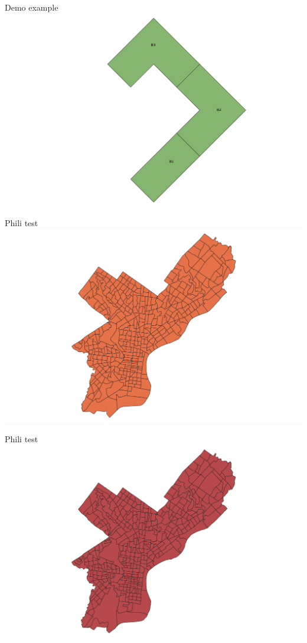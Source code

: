 \documentclass{beamer}
\begin{document}
\begin{frame}{Demo example}
    \centering 
    \includegraphics[width=\linewidth]{figures/Demo07} 
\end{frame}

\begin{frame}{Phili test}
    \centering 
    \includegraphics[width=\linewidth]{figures/phili01} 
\end{frame}

\begin{frame}{Phili test}
    \centering 
    \includegraphics[width=\linewidth]{figures/phili02} 
\end{frame}
\end{document}
